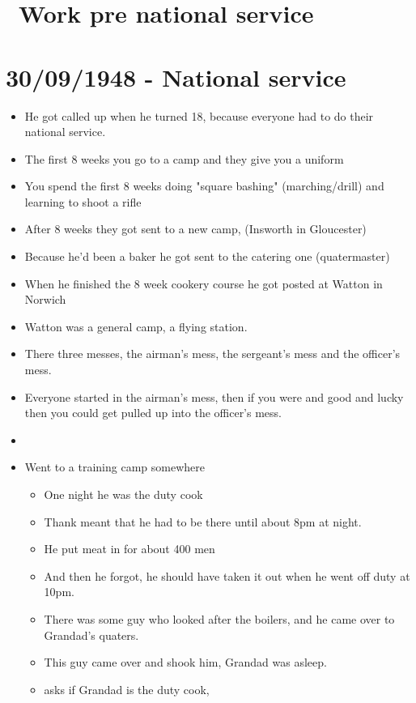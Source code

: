\documentclass[10pt,twocolumn,letterpaper]{article}
\begin{document}
\section{~Work pre national service}

\section{30/09/1948 - National service}
\begin{itemize}
    \item He got called up when he turned 18, because everyone had to do their national service.
    \item The first 8 weeks you go to a camp and they give you a uniform
    \item You spend the first 8 weeks doing "square bashing" (marching/drill) and learning to shoot a rifle
    \item After 8 weeks they got sent to a new camp, (Insworth in Gloucester)
    \item Because he'd been a baker he got sent to the catering one (quatermaster)
    \item When he finished the 8 week cookery course he got posted at Watton in Norwich
    \item Watton was a general camp, a flying station.
    \item There three messes, the airman's mess, the sergeant's mess and the officer's mess.
    \item Everyone started in the airman's mess, then if you were and good and lucky then you could get pulled up into the officer's mess.
    \item 
    \item Went to a training camp somewhere
          \begin{itemize}
              \item One night he was the duty cook
              \item Thank meant that he had to be there until about 8pm at night.
              \item He put meat in for about 400 men
              \item And then he forgot, he should have taken it out when he went off duty at 10pm.
              \item There was some guy who looked after the boilers, and he came over to Grandad's quaters.
              \item This guy came over and shook him, Grandad was asleep.
              \item asks if Grandad is the duty cook,

\end{itemize}
\end{itemize}
\end{document}
